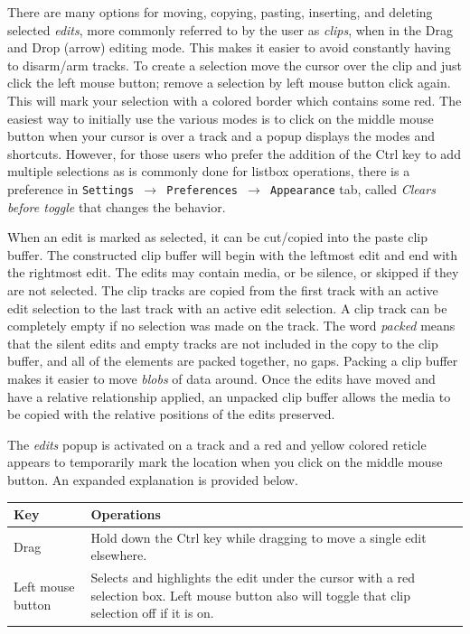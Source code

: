 There are many options for moving, copying, pasting, inserting, and deleting selected \textit{edits}, more commonly referred to by the user as \textit{clips}, when in the Drag and Drop (arrow) editing mode.  This makes it easier to avoid constantly having to disarm/arm tracks.  To create a selection move the cursor over the clip and just click the left mouse button; remove a selection by left mouse button click again.  This will mark your selection with a colored border which contains some red.  The easiest way to initially use the various modes is to click on the middle mouse button when your cursor is over a track and a popup displays the modes and shortcuts.  However, for those users who prefer the addition of the Ctrl key to add multiple selections as is commonly done for listbox operations, there is a preference in \texttt{Settings $\rightarrow$ Preferences $\rightarrow$ Appearance} tab, called \textit{Clears before toggle} that changes the behavior.

When an edit is marked as selected, it can be cut/copied into the paste clip buffer.  The constructed clip buffer will begin with the leftmost edit and end with the rightmost edit.  The edits may contain media, or be silence, or skipped if they are not selected.  The clip tracks are copied from the first track with an active edit selection to the last track with an active edit selection.  A clip track can be completely empty if no selection was made on the track.  The word \textit{packed} means that the silent edits and empty tracks are not included in the copy to the clip buffer, and all of the elements are packed together, no gaps.  Packing a clip buffer makes it easier to move \textit{blobs} of data around.  Once the edits have moved and have a relative relationship applied, an unpacked clip buffer allows the media to be copied with the relative positions of the edits preserved.

The \textit{edits} popup is activated on a track and a red and yellow colored reticle appears to temporarily mark the location when you click on the middle mouse button.  An expanded explanation is provided below.

\begin{center}
    \begin{tabular}{l p{12.9cm}}
        \toprule
        \textbf{Key} & \textbf{Operations} \\
        \midrule
        Drag & Hold down the Ctrl key while dragging to move a single edit elsewhere. \\
        Left mouse button & Selects and highlights the edit under the cursor with a red selection box. Left mouse button also will toggle that clip selection off if it is on. \\
        \bottomrule
    \end{tabular}
\end{center}

